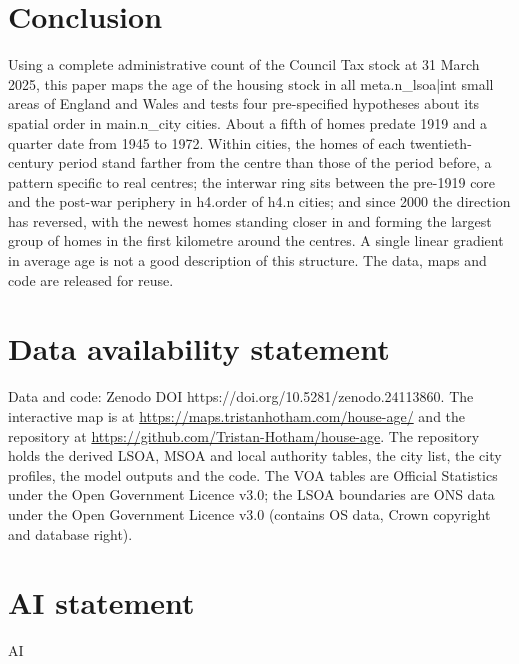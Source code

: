 \section{Conclusion}
\label{sec:conclusion}
Using a complete administrative count of the Council Tax stock at 31 March 2025, this paper maps the age of the housing stock in all {{meta.n_lsoa|int}} small areas of England and Wales and tests four pre-specified hypotheses about its spatial order in {{main.n_city}} cities. About a fifth of homes predate 1919 and a quarter date from 1945 to 1972. Within cities, the homes of each twentieth-century period stand farther from the centre than those of the period before, a pattern specific to real centres; the interwar ring sits between the pre-1919 core and the post-war periphery in {{h4.order}} of {{h4.n}} cities; and since 2000 the direction has reversed, with the newest homes standing closer in and forming the largest group of homes in the first kilometre around the centres. A single linear gradient in average age is not a good description of this structure. The data, maps and code are released for reuse.

\section*{Data availability statement}
Data and code: Zenodo DOI https://doi.org/10.5281/zenodo.24113860. The interactive map is at \url{https://maps.tristanhotham.com/house-age/} and the repository at \url{https://github.com/Tristan-Hotham/house-age}. The repository holds the derived LSOA, MSOA and local authority tables, the city list, the city profiles, the model outputs and the code. The VOA tables are Official Statistics under the Open Government Licence v3.0; the LSOA boundaries are ONS data under the Open Government Licence v3.0 (contains OS data, Crown copyright and database right).

\section*{AI statement}
{{AI}}

